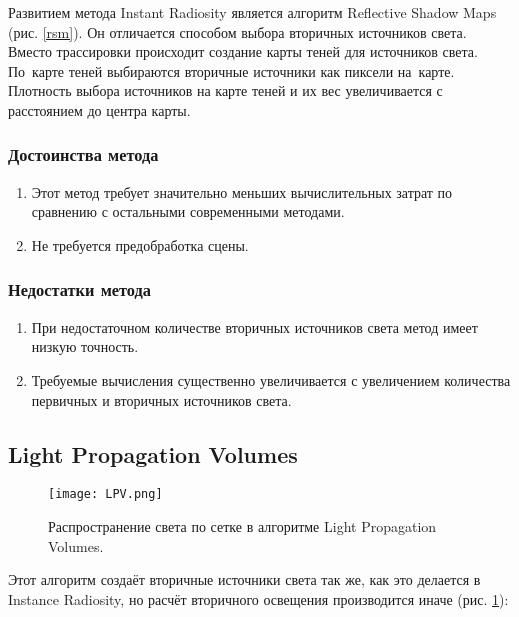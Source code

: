 \documentclass[12pt,fleqn]{article}
\begin{document}
Развитием метода Instant Radiosity является алгоритм Reflective Shadow Maps \cite{ReflectiveShadowMaps} (рис. \ref{rsm}). Он отличается способом выбора вторичных источников света. Вместо трассировки происходит создание карты теней \cite{ShadowMaps} для источников света. По~карте теней выбираются вторичные источники как пиксели на~карте. Плотность выбора источников на карте теней и их вес увеличивается с расстоянием до центра карты.

\subsubsection{Достоинства метода}

\begin{enumerate}

\item Этот метод требует значительно меньших вычислительных затрат по сравнению с остальными современными методами.

\item Не требуется предобработка сцены.

\end{enumerate}

\subsubsection{Недостатки метода}

\begin{enumerate}

\item При недостаточном количестве вторичных источников света метод имеет низкую точность.

\item Требуемые вычисления существенно увеличивается с увеличением количества первичных и вторичных источников света.

\end{enumerate}

\subsection{Light Propagation Volumes}

\begin{figure}[htb]
    \centering
    \texttt{[image: LPV.png]}
    \caption{Распространение света по сетке в алгоритме Light Propagation Volumes.}
    \label{lpv}
\end{figure}

Этот алгоритм \cite{LightPropagationVolumes} создаёт вторичные источники света так же, как это делается в Instance Radiosity, но расчёт вторичного освещения производится иначе (рис. \ref{lpv}):
\end{document}
